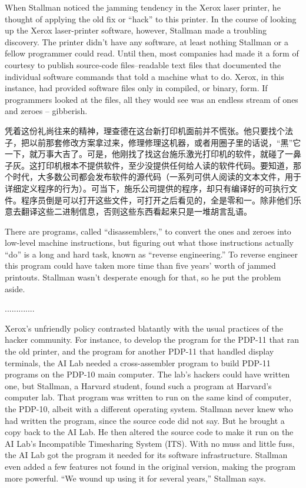 \ifdefined\eng
When Stallman noticed the jamming tendency in the Xerox laser printer, he thought of applying the old fix or ``hack'' to this printer. In the course of looking up the Xerox laser-printer software, however, Stallman made a troubling discovery. The printer didn't have any software, at least nothing Stallman or a fellow programmer could read. Until then, most companies had made it a form of courtesy to publish source-code files--readable text files that documented the individual software commands that told a machine what to do. Xerox, in this instance, had provided software files only in compiled, or binary, form. If programmers looked at the files, all they would see was an endless stream of ones and zeroes -- gibberish.
\fi

\ifdefined\chs
凭着这份礼尚往来的精神，理查德在这台新打印机面前并不慌张。他只要找个法子，把以前那套修改方案拿过来，修理修理这机器，或者用圈子里的话说，“黑”它一下，就万事大吉了。可是，他刚找了找这台施乐激光打印机的软件，就碰了一鼻子灰。这打印机根本不提供软件，至少没提供任何给人读的软件代码。要知道，那个时代，大多数公司都会发布软件的源代码（一系列可供人阅读的文本文件，用于详细定义程序的行为）。可当下，施乐公司提供的程序，却只有编译好的可执行文件。程序员倒是可以打开这些文件，可打开之后看见的，全是零和一。除非他们乐意去翻译这些二进制信息，否则这些东西看起来只是一堆胡言乱语。
\fi

\ifdefined\eng
There are programs, called ``disassemblers,'' to convert the ones and zeroes into low-level machine instructions, but figuring out what those instructions actually ``do'' is a long and hard task, known as ``reverse engineering.''  To reverse engineer this program could have taken more time than five years' worth of jammed printouts.  Stallman wasn't desperate enough for that, so he put the problem aside.
\fi

\ifdefined\chs
.............
\fi

\ifdefined\eng
Xerox's unfriendly policy contrasted blatantly with the usual practices of the hacker community.  For instance, to develop the program for the PDP-11 that ran the old printer, and the program for another PDP-11 that handled display terminals, the AI Lab needed a cross-assembler program to build PDP-11 programs on the PDP-10 main computer. The lab's hackers could have written one, but Stallman, a Harvard student, found such a program at Harvard's computer lab. That program was written to run on the same kind of computer, the PDP-10, albeit with a different operating system. Stallman never knew who had written the program, since the source code did not say.  But he brought a copy back to the AI Lab. He then altered the source code to make it run on the AI Lab's Incompatible Timesharing System (ITS). With no muss and little fuss, the AI Lab got the program it needed for its software infrastructure. Stallman even added a few features not found in the original version, making the program more powerful. ``We wound up using it for several years,'' Stallman says.
\fi

